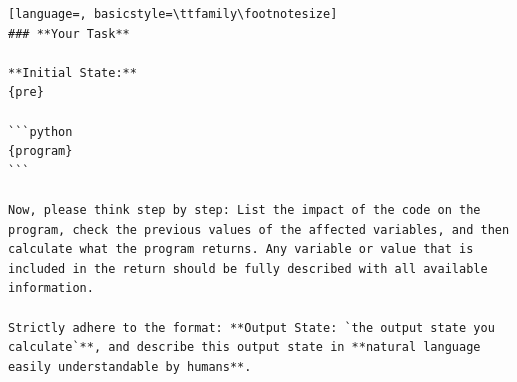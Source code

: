 \documentclass[sigconf]{acmart}
\begin{document}
\begin{tcolorbox}[ colback=gray!10, colframe=black, arc=5pt]
\begin{lstlisting}[language=, basicstyle=\ttfamily\footnotesize]
### **Your Task**

**Initial State:**  
{pre}

```python
{program}
```

Now, please think step by step: List the impact of the code on the program, check the previous values of the affected variables, and then calculate what the program returns. Any variable or value that is included in the return should be fully described with all available information.

Strictly adhere to the format: **Output State: `the output state you calculate`**, and describe this output state in **natural language easily understandable by humans**.

\end{lstlisting}
\end{tcolorbox}
\end{document}
